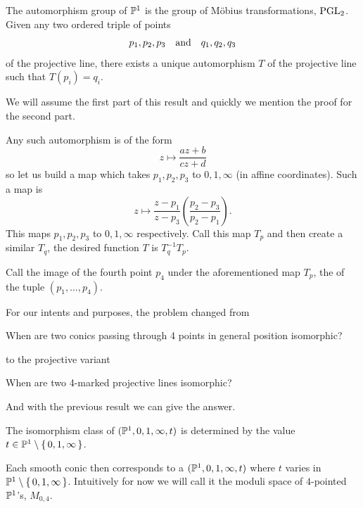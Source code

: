 \documentclass[12pt]{memoir}
\begin{document}
\begin{Th}
    The automorphism group of $\mathbb{P}^1$ is the group of Möbius transformations, $\operatorname{PGL}_2$. Given any two ordered triple of points 
    $$p_1,p_2,p_3\quad\text{and}\quad q_1,q_2,q_3$$
of the projective line, there exists a unique automorphism $T$
 of the projective line such that $T(p_i)=q_i$.
\end{Th}

We will assume the first part of this result and quickly we mention the proof for the second part.

\begin{ptcbp}
Any such automorphism is of the form 
$$z\mapsto \frac{az+b}{cz+d}$$
so let us build a map which takes $p_1,p_2,p_3$ to $0,1,\infty$ (in affine coordinates). Such a map is 
$$z\mapsto\frac{z-p_1}{z-p_3}\left(\frac{p_2-p_3}{p_2-p_1}\right).$$
    This maps $p_1,p_2,p_3$ to $0,1,\infty$ respectively. Call this map $T_p$ and then create a similar $T_q$, the desired function $T$ is $T_q^{-1}T_p$.
\end{ptcbp}

\begin{Def}
    Call the image of the fourth point $p_4$ under the aforementioned map $T_p$, the  of the tuple $(p_1,\dots,p_4)$. 
\end{Def}

For our intents and purposes, the problem changed from
\begin{significant}
    When are two conics passing through 4 points in general position isomorphic?
\end{significant}
to the projective variant 
\begin{significant}
    When are two 4-marked projective lines isomorphic?
\end{significant}
And with the previous result we can give the answer. 

\begin{Th}
    The isomorphism class of $(\mathbb{P}^1,0,1,\infty,t)$ is determined by the value $t\in\mathbb{P}^1\setminus\{\,0,1,\infty\,\}$. 
\end{Th}

 Each smooth conic then corresponds to a $(\mathbb{P}^1, 0, 1, \infty, t)$ where $t$ varies in $\mathbb{P}^1 \setminus \{\,0,1,\infty\,\}$. Intuitively for now we will call it the moduli space of $4$-pointed $\mathbb{P}^1$'s, $M_{0,4}$.\par
\end{document}
